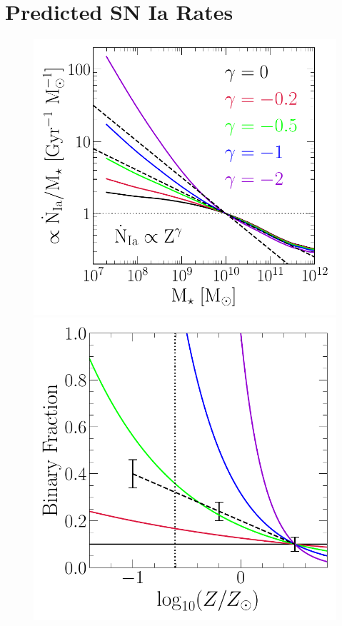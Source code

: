 \documentclass[ms.tex]{subfiles}
\begin{document}
\section{Predicted SN Ia Rates}
\label{sec:predictions}

\begin{figure}
\centering
\includegraphics[scale = 0.55]{umachine_iarate_metdep.pdf}
\includegraphics[scale = 0.56]{binaries_zscaling.pdf}

\end{figure}
\end{document}
